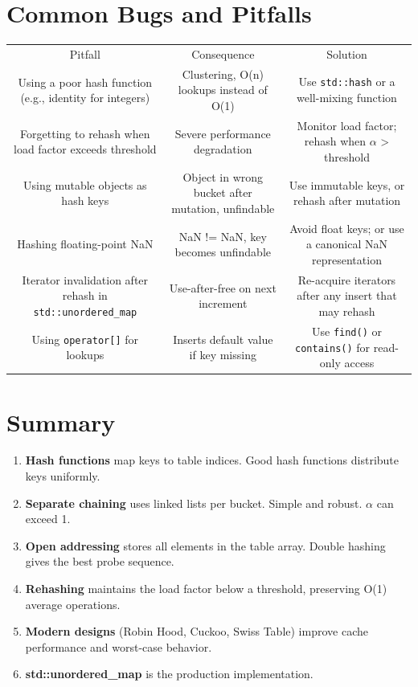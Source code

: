 \section{Common Bugs and Pitfalls}

\begin{center}
\begin{tabular}{ccc}
\toprule
Pitfall & Consequence & Solution \\
Using a poor hash function (e.g., identity for integers) & Clustering, O(n) lookups instead of O(1) & Use \texttt{std::hash} or a well-mixing function \\
Forgetting to rehash when load factor exceeds threshold & Severe performance degradation & Monitor load factor; rehash when $\alpha $ > threshold \\
Using mutable objects as hash keys & Object in wrong bucket after mutation, unfindable & Use immutable keys, or rehash after mutation \\
Hashing floating-point NaN & NaN != NaN, key becomes unfindable & Avoid float keys; or use a canonical NaN representation \\
Iterator invalidation after rehash in \texttt{std::unordered\_map} & Use-after-free on next increment & Re-acquire iterators after any insert that may rehash \\
Using \texttt{operator[]} for lookups & Inserts default value if key missing & Use \texttt{find()} or \texttt{contains()} for read-only access \\

\bottomrule
\end{tabular}
\end{center}
\section{Summary}

\begin{enumerate}
\item \textbf{Hash functions} map keys to table indices. Good hash functions distribute keys uniformly.
\item \textbf{Separate chaining} uses linked lists per bucket. Simple and robust. $\alpha $ can exceed 1.
\item \textbf{Open addressing} stores all elements in the table array. Double hashing gives the best probe sequence.
\item \textbf{Rehashing} maintains the load factor below a threshold, preserving O(1) average operations.
\item \textbf{Modern designs} (Robin Hood, Cuckoo, Swiss Table) improve cache performance and worst-case behavior.
\item \textbf{std::unordered\_map} is the production implementation.
\end{enumerate}

